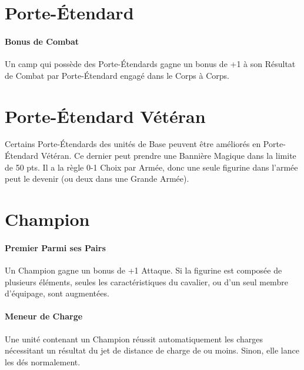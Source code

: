 \section{Porte-Étendard}

\paragraph{Bonus de Combat}

Un camp qui possède des Porte-Étendards gagne un bonus de +1 à son Résultat de Combat par Porte-Étendard engagé dans le Corps à Corps.


\section{Porte-Étendard Vétéran}

Certains Porte-Étendards des unités de Base peuvent être améliorés en Porte-Étendard Vétéran. Ce dernier peut prendre une Bannière Magique dans la limite de 50 pts. Il a la règle 0-1 Choix par Armée, donc une seule figurine dans l'armée peut le devenir (ou deux dans une Grande Armée).

\section{Champion}
\label{champion}

\paragraph{Premier Parmi ses Pairs}

Un Champion gagne un bonus de +1 Attaque. Si la figurine est composée de plusieurs éléments, seules les caractéristiques du cavalier, ou d'un seul membre d'équipage, sont augmentées.

\paragraph{Meneur de Charge}

Une unité contenant un Champion réussit automatiquement les charges nécessitant un résultat du jet de distance de charge de  ou moins. Sinon, elle lance les dés normalement.

